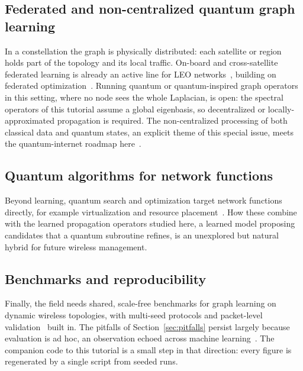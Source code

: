 \subsection{Federated and non-centralized quantum graph learning}
In a constellation the graph is physically distributed: each satellite or region holds
part of the topology and its local traffic. On-board and cross-satellite federated
learning is already an active line for LEO
networks~\cite{razmi2022board,matthiesen2024federated}, building on federated
optimization~\cite{mcmahan2017federated}. Running quantum or quantum-inspired graph
operators in this setting, where no node sees the whole Laplacian, is open: the spectral
operators of this tutorial assume a global eigenbasis, so decentralized or
locally-approximated propagation is required. The non-centralized processing of both
classical data and quantum states, an explicit theme of this special issue, meets the
quantum-internet roadmap here~\cite{wehner2018quantum}.

\subsection{Quantum algorithms for network functions}
Beyond learning, quantum search and optimization target network functions directly, for
example virtualization and resource placement~\cite{botsinis2019quantum}. How these
combine with the learned propagation operators studied here, a learned model proposing
candidates that a quantum subroutine refines, is an unexplored but natural hybrid for
future wireless management.

\subsection{Benchmarks and reproducibility}
Finally, the field needs shared, scale-free benchmarks for graph learning on dynamic
wireless topologies, with multi-seed protocols and packet-level
validation~\cite{kassing2020hypatia} built in. The pitfalls of
Section~\ref{sec:pitfalls} persist largely because evaluation is ad hoc, an observation
echoed across machine
learning~\cite{henderson2018matters,pineau2021reproducibility,dehghani2021lottery}. The
companion code to this tutorial is a small step in that direction: every figure is
regenerated by a single script from seeded runs.
